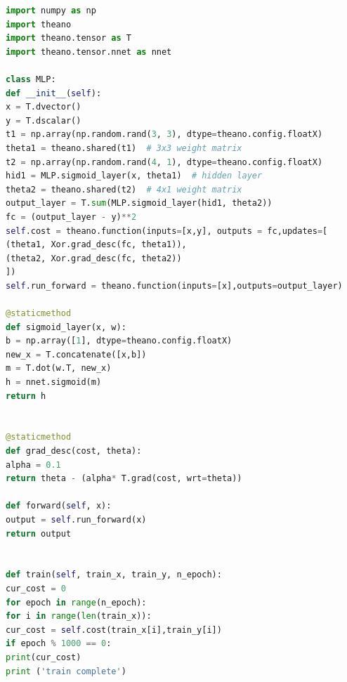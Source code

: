 \begin{lstlisting}[caption={Theano MLP},label={lst:theanomlp}, language={python}]
import numpy as np
import theano
import theano.tensor as T
import theano.tensor.nnet as nnet

class MLP:
def __init__(self):
x = T.dvector()
y = T.dscalar()
t1 = np.array(np.random.rand(3, 3), dtype=theano.config.floatX)
theta1 = theano.shared(t1)  # 3x3 weight matrix
t2 = np.array(np.random.rand(4, 1), dtype=theano.config.floatX)
hid1 = MLP.sigmoid_layer(x, theta1)  # hidden layer
theta2 = theano.shared(t2)  # 4x1 weight matrix
output_layer = T.sum(MLP.sigmoid_layer(hid1, theta2))
fc = (output_layer - y)**2
self.cost = theano.function(inputs=[x,y], outputs = fc,updates=[
(theta1, Xor.grad_desc(fc, theta1)),
(theta2, Xor.grad_desc(fc, theta2))
])
self.run_forward = theano.function(inputs=[x],outputs=output_layer)

@staticmethod
def sigmoid_layer(x, w):
b = np.array([1], dtype=theano.config.floatX)
new_x = T.concatenate([x,b])
m = T.dot(w.T, new_x)
h = nnet.sigmoid(m)
return h


@staticmethod
def grad_desc(cost, theta):
alpha = 0.1
return theta - (alpha* T.grad(cost, wrt=theta))

def forward(self, x):
output = self.run_forward(x)
return output


def train(self, train_x, train_y, n_epoch):
cur_cost = 0
for epoch in range(n_epoch):
for i in range(len(train_x)):
cur_cost = self.cost(train_x[i],train_y[i])
if epoch % 1000 == 0:
print(cur_cost)
print ('train complete')
\end{lstlisting}
